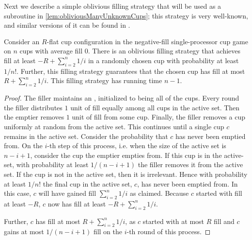 Next we describe a simple oblivious filling strategy that will be used as a
subroutine in \cref{lem:obliviousManyUnknownCups}; this strategy is very
well-known, and similar versions of it can be found in
\cite{ mbe19, mbe15, die91, wku20}.
\begin{proposition}
  \label{prop:obliviousTerribleProbability}
  Consider an $R$-flat cup configuration in the negative-fill
  single-processor cup game on $n$ cups with average fill $0$.
  There is an oblivious filling strategy that
  achieves fill at least $-R + \sum_{i=2}^{n} 1/i$ in a randomly chosen
  cup with probability at least $1/n!$. Further, this filling strategy
  guarantees that the chosen cup has fill at most $R +
  \sum_{i=2}^{n} 1/i$. This filling strategy
  has running time $n-1$.
\end{proposition}
\begin{proof}
  The filler maintains an , initialized to being
  all of the cups. Every round the filler distributes $1$ unit of
  fill equally among all cups in the active set. Then the emptier
  removes $1$ unit of fill from some cup. Finally, the filler
  removes a cup uniformly at random from the active set. This
  continues until a single cup $c$ remains in the active set. 
  Consider the probability that $c$ has never been emptied
  from. On the $i$-th step of this process, i.e. when the size of
  the active set is $n-i+1$, consider the cup the emptier empties
  from. If this cup is in the active-set, with probability at
  least $1/(n-i+1)$ the filler removes it from the active set.
  If the cup is not in the active set, then it is irrelevant.
  Hence with probability at least $1/n!$ the final
  cup in the active set, $c$, has never been emptied from.
  In this case, $c$ will have gained fill $\sum_{i=2}^n 1/i$
  as claimed. Because $c$ started with fill at
  least $-R$, $c$ now has fill at least $-R+ \sum_{i=2}^n 1/i$. 

  Further, $c$ has fill at most $R + \sum_{i=2}^n 1/i$, as $c$
  started with at most $R$ fill and $c$ gains at most $1/(n-i+1)$ fill
  on the $i$-th round of this process.
\end{proof}

